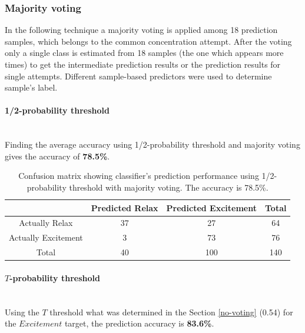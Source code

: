 \documentclass[12pt]{article}
\theoremstyle{definition}
\begin{document}
\subsubsection{Majority voting}

In the following technique a majority voting is applied among 18 prediction samples, which belongs to the common concentration attempt. After the voting only a single class is estimated from 18 samples (the one which appears more times) to get the intermediate prediction results or the prediction results for single attempts. Different sample-based predictors were used to determine sample's label.

\paragraph{1/2-probability threshold}~\\

Finding the average accuracy using 1/2-probability threshold and majority voting gives the accuracy of \textbf{78.5\%}.
\begin{table}[H]
\begin{center}
  \begin{tabular}{ | c | c | c | c | }
    \hline
     & Predicted Relax & Predicted Excitement & Total \\ \hline
    Actually Relax & 37 & 27 & 64 \\ \hline
    Actually Excitement & 3 & 73 & 76 \\ \hline
    Total & 40 & 100 & 140 \\ 
    \hline
  \end{tabular}
\end{center}
\caption{Confusion matrix showing classifier's prediction performance using 1/2-probability threshold with majority voting. The accuracy is 78.5\%.} 
\end{table}

\paragraph{$T$-probability threshold}~\\

Using the $T$ threshold what was determined in the Section \ref{no-voting} (0.54) for the $Excitement$ target, the prediction accuracy is \textbf{83.6\%}.
\end{document}
